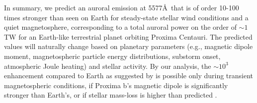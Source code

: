 \documentclass[apjl]{emulateapj}
\begin{document}
In summary, we predict an auroral emission at 5577\AA\ that is of order 10-100 times stronger than seen on Earth for steady-state stellar wind conditions and a quiet magnetosphere, corresponding to a total auroral power on the order of ${\sim} 1$ TW for an Earth-like terrestrial planet orbiting Proxima Centauri. The predicted values will naturally change based on planetary parameters (e.g., magnetic dipole moment, magnetospheric particle energy distributions, substorm onset, atmospheric Joule heating) and stellar activity. By our analysis, the ${\sim} 10^3$ enhancement compared to Earth as suggested by \citet{OMalley2016} is possible only during transient magnetospheric conditions, if Proxima b's magnetic dipole is significantly stronger than Earth's, or if stellar mass-loss is higher than predicted \citep{Wood2005,Cohen2014}.

%
%
% 
 
\end{document}
